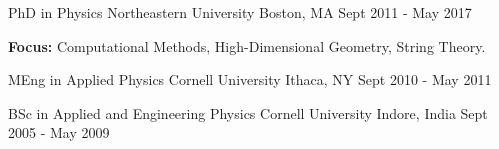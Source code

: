 

\begin{cventries}

  \cventry
    {PhD in Physics} %
    {Northeastern University} %
    {Boston, MA} %
    {Sept 2011 - May 2017} %
    {
      \begin{cvitems} %
        \item {\textbf{Focus:} Computational Methods, High-Dimensional Geometry, String Theory.}
      \end{cvitems}
    }

  \cventry
    {MEng in Applied Physics} %
    {Cornell University} %
    {Ithaca, NY} %
    {Sept 2010 - May 2011} %
    {
    }

  \cventry
    {BSc in Applied and Engineering Physics} %
    {Cornell University} %
    {Indore, India} %
    {Sept 2005 - May 2009} %
    {
    }
\end{cventries}
